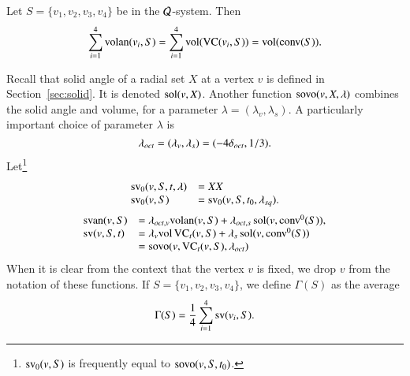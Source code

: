 \begin{claim}\label{claim:volan} Let $S=\{v_1,v_2,v_3,v_4\}$ be in
the ${\mathcal Q}$-system. Then
    $$
    \sum_{i=1}^4 {\operatorname{volan}}(v_i,S) = \sum_{i=1}^4
    {\operatorname{vol}}({\operatorname{VC}}(v_i,S)) = {\operatorname{vol}}({\operatorname{conv}}(S)).
    $$
\end{claim}



\begin{definition}\label{def:svor}
Recall that solid angle of a radial set $X$ at a vertex $v$ is defined in
Section~\ref{sec:solid}.  It is denoted $\operatorname{sol}(v,X)$.
Another function ${\operatorname{sovo}}(v,X,\lambda)$ combines the solid
angle and volume, for a parameter $\lambda=(\lambda_v,\lambda_s)$.
A particularly important choice of parameter $\lambda$ is
$$
 \lambda_{oct}=(\lambda_v,\lambda_s)=(-4\delta_{oct},1/3).
$$
Let\footnote{${\operatorname{sv}}_0(v,S)$  is frequently equal to
${\operatorname{sovo}}(v,S,t_0)$.}
$$
\begin{array}{lll}
  {\operatorname{sv}}_0(v,S,t,\lambda) &= XX \\ 
  {\operatorname{sv}}_0(v,S) &= {\operatorname{sv}}_0(v,S,t_0,\lambda_{sq}).
\end{array}
$$
%
      $$
      \begin{array}{lll}
      {\operatorname{svan}}(v,S) &= \lambda_{oct,v} {\operatorname{volan}}(v,S)
         +\lambda_{oct,s}\operatorname{sol}(v,{\operatorname{conv}}^0(S)),\\
      {\operatorname{sv}}(v,S,t) &= \lambda_v {\operatorname{vol}}\,{\operatorname{VC}}_{t}(v,S)
         +\lambda_s\operatorname{sol}(v,{\operatorname{conv}}^0(S))\\
          &= {\operatorname{sovo}}(v,{\operatorname{VC}}_t(v,S),\lambda_{oct})\\
      \end{array}$$
When it is clear from the context that the vertex $v$ is
fixed, we drop $v$ from the notation of these
functions.
   If $S=\{v_1,v_2,v_3,v_4\}$, we define $\Gamma(S)$ as the average
   \begin{equation}
   \Gamma(S) = \frac{1}{4}\sum_{i=1}^4{\operatorname{sv}}(v_i,S).
   \label{eqn:gamma}
   \end{equation}
%
\end{definition}

